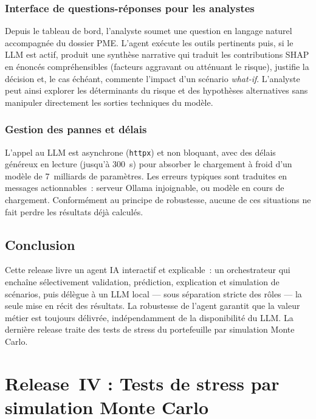 \documentclass[a4paper,12pt,oneside]{report}
\begin{document}
\subsection{Interface de questions-réponses pour les analystes}

Depuis le tableau de bord, l'analyste soumet une question en langage naturel accompagnée du
dossier PME. L'agent exécute les outils pertinents puis, si le LLM est actif, produit une
synthèse narrative qui traduit les contributions SHAP en énoncés compréhensibles (facteurs
aggravant ou atténuant le risque), justifie la décision et, le cas échéant, commente l'impact
d'un scénario \textit{what-if}. L'analyste peut ainsi explorer les déterminants du risque et des
hypothèses alternatives sans manipuler directement les sorties techniques du modèle.

\subsection{Gestion des pannes et délais}

L'appel au LLM est asynchrone (\texttt{httpx}) et non bloquant, avec des délais généreux en
lecture (jusqu'à 300~s) pour absorber le chargement à froid d'un modèle de 7~milliards de
paramètres. Les erreurs typiques sont traduites en messages actionnables~: serveur Ollama
injoignable, ou modèle en cours de chargement. Conformément au principe de robustesse, aucune
de ces situations ne fait perdre les résultats déjà calculés.

\section*{Conclusion}

Cette release livre un agent IA interactif et explicable~: un orchestrateur qui enchaîne
sélectivement validation, prédiction, explication et simulation de scénarios, puis délègue à un
LLM local — sous séparation stricte des rôles — la seule mise en récit des résultats. La
robustesse de l'agent garantit que la valeur métier est toujours délivrée, indépendamment de la
disponibilité du LLM. La dernière release traite des tests de stress du portefeuille par
simulation Monte Carlo.

\chapter{Release~IV : Tests de stress par simulation Monte Carlo}
\end{document}
